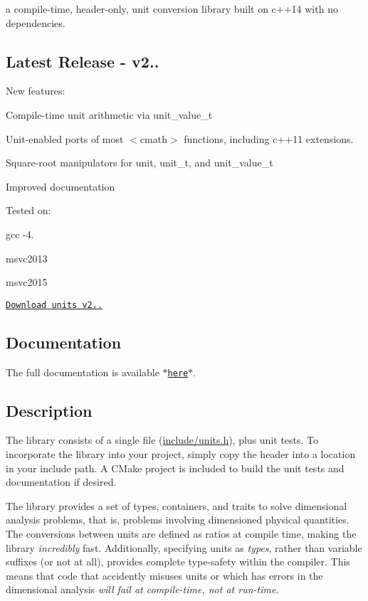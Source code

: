 a compile-\/time, header-\/only, unit conversion library built on c++14 with no dependencies.

\subsection*{Latest Release -\/ v2.. }

New features\+:
\begin{DoxyItemize}
\item Compile-\/time unit arithmetic via {\ttfamily unit\+\_\+value\+\_\+t}
\item Unit-\/enabled ports of most {\ttfamily $<$cmath$>$} functions, including c++11 extensions.
\item Square-\/root manipulators for {\ttfamily unit}, {\ttfamily unit\+\_\+t}, and {\ttfamily unit\+\_\+value\+\_\+t}
\item Improved documentation
\end{DoxyItemize}

Tested on\+:
\begin{DoxyItemize}
\item gcc -\/4.
\item msvc2013
\item msvc2015
\end{DoxyItemize}

\href{https://github.com/nholthaus/units/releases/tag/v2.0.0}{\tt Download units v2..}

\subsection*{Documentation }

The full documentation is available $\ast$\href{http://nholthaus.github.io/units}{\tt here}$\ast$.

\subsection*{Description }

The library consists of a single file (\hyperlink{units_8h}{include/units.\+h}), plus unit tests. To incorporate the library into your project, simply copy the header into a location in your include path. A C\+Make project is included to build the unit tests and documentation if desired.

The library provides a set of types, containers, and traits to solve dimensional analysis problems, that is, problems involving dimensioned physical quantities. The conversions between units are defined as ratios at compile time, making the library {\itshape incredibly} fast. Additionally, specifying units as {\itshape types}, rather than variable suffixes (or not at all), provides complete type-\/safety within the compiler. This means that code that accidently misuses units or which has errors in the dimensional analysis {\itshape will fail at compile-\/time, not at run-\/time}.

